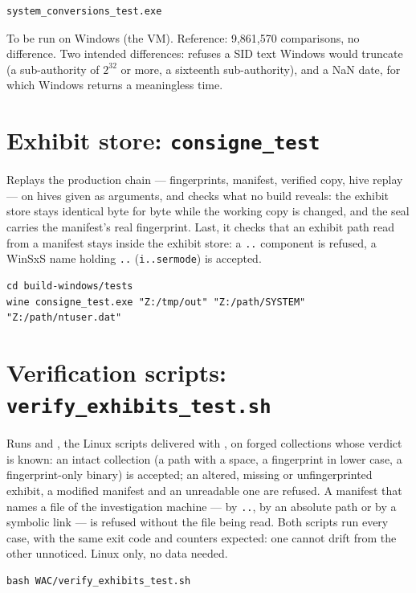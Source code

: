 \documentclass[11pt,a4paper,oneside]{report}
\begin{document}
\begin{lstlisting}
system_conversions_test.exe
\end{lstlisting}

To be run on Windows (the VM). Reference: 9,861,570 comparisons, no difference.
Two intended differences: \wac{} refuses a SID text Windows would truncate (a
sub-authority of $2^{32}$ or more, a sixteenth sub-authority), and a NaN date,
for which Windows returns a meaningless time.

\section{Exhibit store: \texttt{consigne\_test}}

Replays the production chain — fingerprints, manifest, verified copy, hive
replay — on hives given as arguments, and checks what no build reveals: the
exhibit store stays identical byte for byte while the working copy is changed,
and the seal carries the manifest's real fingerprint. Last, it checks that an
exhibit path read from a manifest stays inside the exhibit store: a
\texttt{..} component is refused, a WinSxS name holding \texttt{..}
(\texttt{i..sermode}) is accepted.

\begin{lstlisting}
cd build-windows/tests
wine consigne_test.exe "Z:/tmp/out" "Z:/path/SYSTEM" "Z:/path/ntuser.dat"
\end{lstlisting}

\section{Verification scripts: \texttt{verify\_exhibits\_test.sh}}

Runs  and , the
Linux scripts delivered with , on forged collections whose
verdict is known: an intact collection (a path with a space, a fingerprint in
lower case, a fingerprint-only binary) is accepted; an altered, missing or
unfingerprinted exhibit, a modified manifest and an unreadable one are refused.
A manifest that names a file of the investigation machine — by \texttt{..}, by
an absolute path or by a symbolic link — is refused without the file being
read. Both scripts run every case, with the same exit code and counters
expected: one cannot drift from the other unnoticed. Linux only, no data
needed.

\begin{lstlisting}
bash WAC/verify_exhibits_test.sh
\end{lstlisting}
\end{document}
